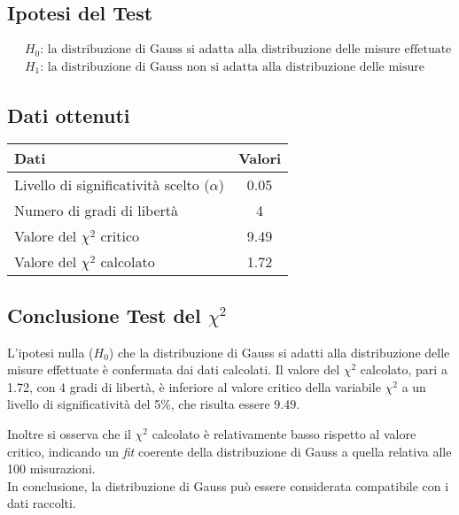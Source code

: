 \documentclass{article}
\begin{document}
\subsection{Ipotesi del Test}
\begin{align*}
    &\text{$H_0$:} \text{ la distribuzione di Gauss si adatta alla distribuzione delle misure effetuate}     \\ \
	&\text{$H_1$:} \text{ la distribuzione di Gauss non si adatta alla distribuzione delle misure effettuate } \
\end{align*}

\subsection{Dati ottenuti}

\begin{table}[ht]
	\centering
	\begin{tabular}{@{}lc@{}}
		\toprule
		\textbf{Dati} & \textbf{Valori} \\
		\midrule
		Livello di significatività scelto ($\alpha $) & 0.05 \\
		Numero di gradi di libertà & 4 \\
		Valore del $\chi^2$ critico & 9.49 \\
		Valore del $\chi^2$ calcolato & 1.72 \\
		\bottomrule
	\end{tabular}
\end{table}

\subsection{Conclusione Test del $\chi^2$}
L'ipotesi nulla ($H_0$) che la distribuzione di Gauss si adatti alla distribuzione delle misure effettuate è confermata dai dati calcolati. Il valore del $\chi^2$ calcolato, pari a 1.72, con 4 gradi di libertà, è inferiore al valore critico della variabile $\chi^2$ a un livello di significatività del 5\%, che risulta essere 9.49.

Inoltre si osserva che il $\chi^2$ calcolato è relativamente basso rispetto al valore critico, indicando un \textit{fit} coerente della distribuzione di Gauss a quella relativa alle 100 misurazioni. 
\\In conclusione, la distribuzione di Gauss può essere considerata compatibile con i dati raccolti.
\end{document}
